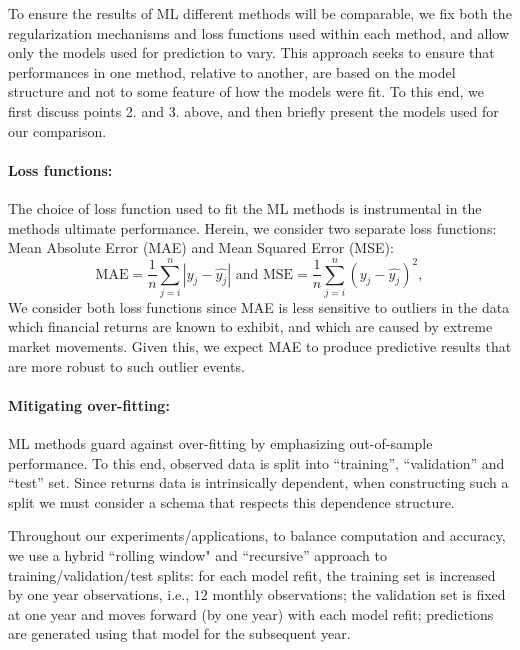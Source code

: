 \documentclass{article}
\begin{document}
To ensure the results of ML different methods will be comparable, we fix both the regularization mechanisms and loss functions used within each method, and allow only the models used for prediction to vary. This approach seeks to ensure that performances in one method, relative to another, are based on the model structure and not to some feature of how the models were fit. To this end, we first discuss points 2. and 3. above, and then briefly present the models used for our comparison. 
\paragraph{Loss functions:}The choice of loss function used to fit the ML methods is instrumental in the methods ultimate performance. Herein, we consider two separate loss functions: Mean Absolute Error (MAE) and Mean Squared Error (MSE):
\begin{equation*}
\text{MAE} = \frac{1}{n} \sum_{j = i}^{n} |y_j - \hat{y_j}|\text{ and }
\text{MSE} = \frac{1}{n} \sum_{j = i}^{n} \left( y_j - \hat{y_j}\right) ^2,
\end{equation*}We consider both loss functions since MAE is less sensitive to outliers in the data which financial returns are known to exhibit, and which are caused by extreme market movements. Given this, we expect MAE to  produce predictive results that are more robust to such outlier events. 

\paragraph{Mitigating over-fitting:}ML methods guard against over-fitting by emphasizing out-of-sample performance. To this end, observed data is split into ``training”, ``validation'' and ``test'' set. Since returns data is intrinsically dependent, when constructing such a split we must consider a schema that respects this dependence structure. 

Throughout our experiments/applications, to balance computation and accuracy, we use a  hybrid ``rolling window"  and ``recursive'' approach to training/validation/test splits: for each model refit, the training set is increased by one year observations, i.e., $12$ monthly observations; the validation set is fixed at one year and moves forward (by one year) with each model refit; predictions are generated using that model for the subsequent year.


\end{document}
